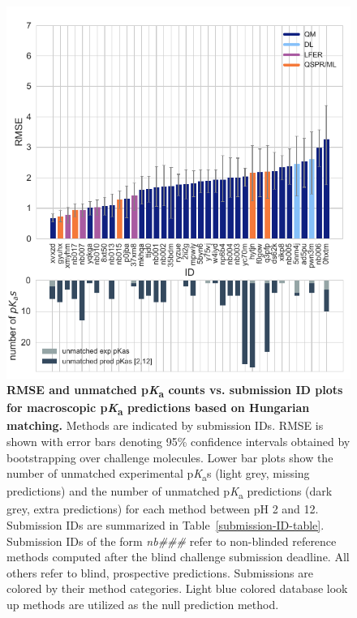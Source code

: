 \documentclass[9pt,lineno,final]{elife}
\newcommand{\pKa}{p\textit{K}\textsubscript{a}}
\begin{document}
\begin{figure}[h]
\centering
\includegraphics[width=0.5\linewidth]{figures/typeIII-rmse-unmatched-pKa-fig.pdf}
\caption{{\bf RMSE and unmatched \pKa{} counts vs. submission ID plots for macroscopic \pKa{} predictions based on Hungarian matching.} 
Methods are indicated by submission IDs. 
RMSE is shown with error bars denoting 95\% confidence intervals obtained by bootstrapping over challenge molecules. Lower bar plots show the number of unmatched experimental \pKa{}s (light grey, missing predictions) and the number of unmatched \pKa{} predictions (dark grey, extra predictions) for each method between pH 2 and 12. Submission IDs are summarized in Table~\ref{submission-ID-table}. Submission IDs of the form \textit{nb\#\#\#} refer to non-blinded reference methods computed after the blind challenge submission deadline. All others refer to blind, prospective predictions. Submissions are colored by their method categories. Light blue colored database look up methods are utilized as the null prediction method.
}
\label{fig:typeIII-rmse-plot}
\end{figure}
\end{document}
